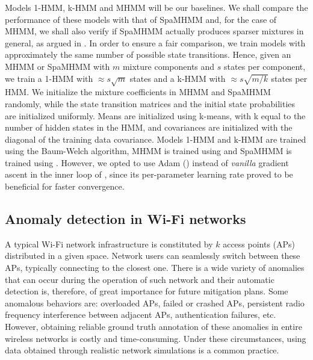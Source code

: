 Models 1-HMM, k-HMM and MHMM will be our baselines. We shall compare the performance of these models with that of SpaMHMM and, for the case of MHMM, we shall also verify if SpaMHMM actually produces sparser mixtures in general, as argued in . In order to ensure a fair comparison, we train models with approximately the same number of possible state transitions. Hence, given an MHMM or SpaMHMM with $m$ mixture components and $s$ states per component, we train a 1-HMM with $\approx s\sqrt{m}$ states and a k-HMM with $\approx s\sqrt{m/k}$ states per HMM. We initialize the mixture coefficients in MHMM and SpaMHMM randomly, while the state transition matrices and the initial state probabilities are initialized uniformly. Means are initialized using k-means, with k equal to the number of hidden states in the HMM, and covariances are initialized with the diagonal of the training data covariance. Models 1-HMM and k-HMM are trained using the Baum-Welch algorithm, MHMM is trained using  and SpaMHMM is trained using . However, we opted to use Adam (\citet{Kingma2014}) instead of \textit{vanilla} gradient ascent in the inner loop of , since its per-parameter learning rate proved to be beneficial for faster convergence.

\subsection{Anomaly detection in Wi-Fi networks}
\label{sec:wi_fi}
A typical Wi-Fi network infrastructure is constituted by $k$ access points (APs) distributed in a given space. Network users can seamlessly switch between these APs, typically connecting to the closest one. There is a wide variety of anomalies that can occur during the operation of such network and their automatic detection is, therefore, of great importance for future mitigation plans. Some anomalous behaviors are: overloaded APs, failed or crashed APs, persistent radio frequency interference between adjacent APs, authentication failures, etc. However, obtaining reliable ground truth annotation of these anomalies in entire wireless networks is costly and time-consuming. Under these circumstances, using data obtained through realistic network simulations is a common practice.

